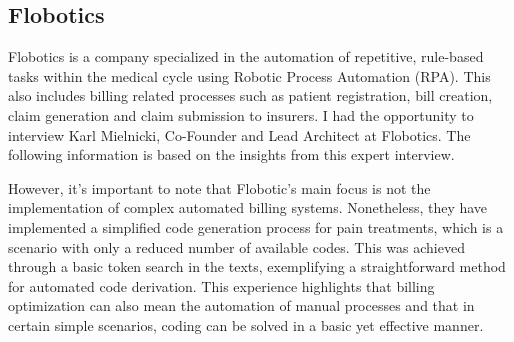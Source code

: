 \subsection{Flobotics}
Flobotics is a company specialized in the automation of repetitive, rule-based tasks within the medical cycle using Robotic Process Automation (RPA).
This also includes billing related processes such as patient registration, bill creation, claim generation and claim submission to insurers.
I had the opportunity to interview Karl Mielnicki, Co-Founder and Lead Architect at Flobotics.
The following information is based on the insights from this expert interview.

However, it's important to note that Flobotic's main focus is not the implementation of complex automated billing systems.
Nonetheless, they have implemented a simplified code generation process for pain treatments, which is a scenario with only a reduced number of available codes.
This was achieved through a basic token search in the texts, exemplifying a straightforward method for automated code derivation.
This experience highlights that billing optimization can also mean the automation of manual processes and that in certain simple scenarios,
coding can be solved in a basic yet effective manner.

